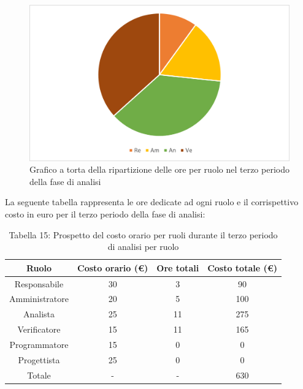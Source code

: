 \begin{figure}[H]
    \centering
    \includegraphics[scale=0.6]{img/grafi preventivo/torta/analisi/periodo3.png}
    \caption{Grafico a torta della ripartizione delle ore per ruolo nel terzo periodo della fase di analisi}
\end{figure}
La seguente tabella rappresenta le ore dedicate ad ogni ruolo e il corrispettivo costo in euro per il terzo periodo della fase di analisi:
\begin{table}[h]
	\setlength\extrarowheight{5pt}
	\centering
	\begin{tabularx}{\textwidth}{|ccc|c|}
		\hline
		\rowcolor{white}
		\textbf{Ruolo} & \textbf{Costo orario (€)} & \textbf{Ore totali} & \textbf{Costo totale (€)} \\
		\hline
		Responsabile &30&3&90 \\
		Amministratore &20&5&100 \\
		Analista &25&11&275 \\
		Verificatore &15&11&165 \\
		Programmatore &15&0&0 \\
		Progettista &25&0&0 \\
		\hline
		Totale &-&-&630 \\
		\hline
	\end{tabularx}
    \vspace{10pt}
	\caption{Tabella 15: Prospetto del costo orario per ruoli durante il terzo periodo di analisi per ruolo}
\end{table}
%
